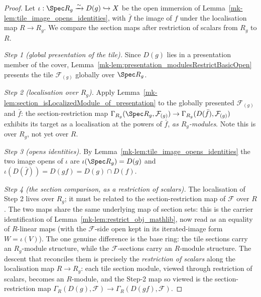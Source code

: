 \begin{proof}
  Let \(\iota : \Spec R_g \xrightarrow{\sim} D(g) \hookrightarrow X\) be the open immersion of
  Lemma~\ref{mk-lem:tile_image_opens_identities}, with \(\bar f\) the image of \(f\) under the
  localisation map \(R \to R_g\). We compare the section maps after restriction of
  scalars from \(R_g\) to \(R\).

  \emph{Step 1 (global presentation of the tile).} Since \(D(g)\) lies in a presentation member of the
  cover, Lemma~\ref{mk-lem:presentation_modulesRestrictBasicOpen} presents the tile
  \(\mathcal{F}_{(g)}\) globally over \(\Spec R_g\).

  \emph{Step 2 (localisation over \(R_g\)).} Apply
  Lemma~\ref{mk-lem:section_isLocalizedModule_of_presentation} to the globally presented
  \(\mathcal{F}_{(g)}\) and \(\bar f\): the section-restriction map
  \(\Gamma_{R_g}(\Spec R_g, \mathcal{F}_{(g)}) \to \Gamma_{R_g}(D(\bar f), \mathcal{F}_{(g)})\)
  exhibits its target as a localisation at the powers of \(\bar f\), \emph{as \(R_g\)-modules}. Note this
  is over \(R_g\), not yet over \(R\).

  \emph{Step 3 (opens identities).} By Lemma~\ref{mk-lem:tile_image_opens_identities} the two image opens of
  \(\iota\) are \(\iota(\Spec R_g) = D(g)\) and \(\iota(D(\bar f)) = D(gf) = D(g) \cap D(f)\).

  \emph{Step 4 (the section comparison, as a restriction of scalars).} The localisation of Step 2 lives
  over \(R_g\); it must be related to the section-restriction map of \(\mathcal{F}\) over \(R\). The two
  maps share the same underlying map of section sets: this is the carrier identification of
  Lemma~\ref{mk-lem:restrict_obj_mathlib}, now read as an equality of \(R\)-linear maps (with the
  \(\mathcal{F}\)-side open kept in its iterated-image form \(W = \iota(V)\)). The one genuine difference
  is the base ring: the tile sections carry an \(R_g\)-module structure, while the
  \(\mathcal{F}\)-sections carry an \(R\)-module structure. The descent that reconciles them is precisely
  the \emph{restriction of scalars} along the localisation map \(R \to R_g\): each tile section module,
  viewed through restriction of scalars, becomes an \(R\)-module, and the Step-2 map so viewed is the
  section-restriction map \(\Gamma_R(D(g), \mathcal{F}) \to \Gamma_R(D(gf), \mathcal{F})\).


\end{proof}
